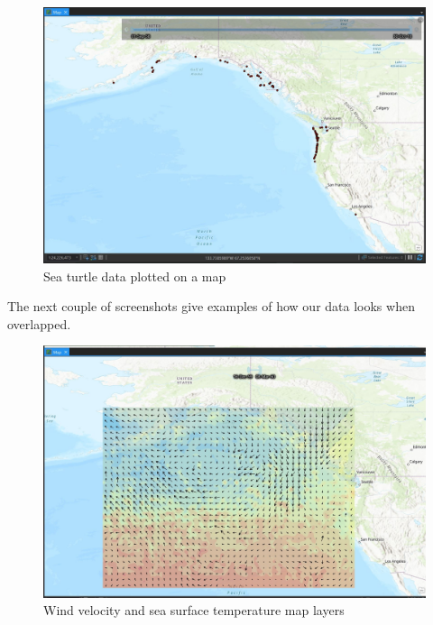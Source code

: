 \documentclass[onecolumn, draftclsnofoot,10pt, compsoc]{IEEEtran}
\begin{document}
\begin{figure}[H]
  \includegraphics[scale=0.55]{turtle_data.JPG}
  \caption{Sea turtle data plotted on a map}
\end{figure}

The next couple of screenshots give examples of how our data looks when overlapped.  \newline

\begin{figure}[H]
  \includegraphics[scale=0.55]{sea_surface_idw_and_wind_map.JPG}
  \caption{Wind velocity and sea surface temperature map layers}
\end{figure}
\end{document}
